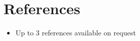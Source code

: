 \documentclass[11pt,a4paper,sans]{moderncv}        %
\begin{document}
\section{References}

\vspace{6pt}
 
\begin{itemize}

\item{Up to 3 references available on request}

\end{itemize}

\nocite{*}



\end{document}
